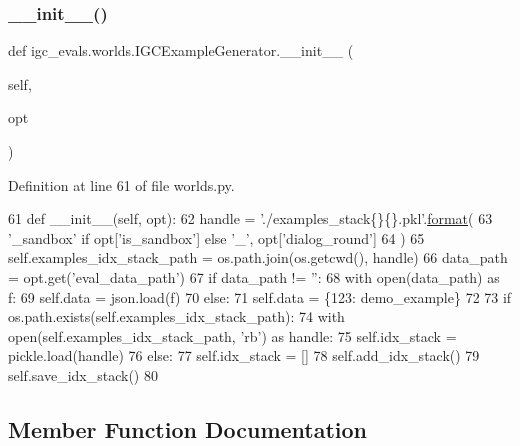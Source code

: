 \subsubsection{\texorpdfstring{\+\_\+\+\_\+init\+\_\+\+\_\+()}{\_\_init\_\_()}}
{\footnotesize\ttfamily def igc\+\_\+evals.\+worlds.\+I\+G\+C\+Example\+Generator.\+\_\+\+\_\+init\+\_\+\+\_\+ (\begin{DoxyParamCaption}\item[{}]{self,  }\item[{}]{opt }\end{DoxyParamCaption})}



Definition at line 61 of file worlds.\+py.


\begin{DoxyCode}
61     \textcolor{keyword}{def }\_\_init\_\_(self, opt):
62         handle = \textcolor{stringliteral}{'./examples\_stack\{\}\{\}.pkl'}.\hyperlink{namespaceparlai_1_1chat__service_1_1services_1_1messenger_1_1shared__utils_a32e2e2022b824fbaf80c747160b52a76}{format}(
63             \textcolor{stringliteral}{'\_sandbox'} \textcolor{keywordflow}{if} opt[\textcolor{stringliteral}{'is\_sandbox'}] \textcolor{keywordflow}{else} \textcolor{stringliteral}{'\_'}, opt[\textcolor{stringliteral}{'dialog\_round'}]
64         )
65         self.examples\_idx\_stack\_path = os.path.join(os.getcwd(), handle)
66         data\_path = opt.get(\textcolor{stringliteral}{'eval\_data\_path'})
67         \textcolor{keywordflow}{if} data\_path != \textcolor{stringliteral}{''}:
68             with open(data\_path) \textcolor{keyword}{as} f:
69                 self.data = json.load(f)
70         \textcolor{keywordflow}{else}:
71             self.data = \{123: demo\_example\}
72 
73         \textcolor{keywordflow}{if} os.path.exists(self.examples\_idx\_stack\_path):
74             with open(self.examples\_idx\_stack\_path, \textcolor{stringliteral}{'rb'}) \textcolor{keyword}{as} handle:
75                 self.idx\_stack = pickle.load(handle)
76         \textcolor{keywordflow}{else}:
77             self.idx\_stack = []
78             self.add\_idx\_stack()
79             self.save\_idx\_stack()
80 
\end{DoxyCode}


\subsection{Member Function Documentation}
\mbox{\label{classigc__evals_1_1worlds_1_1IGCExampleGenerator_aa0801aa3a53c7fd57a759c2080936174}} 
